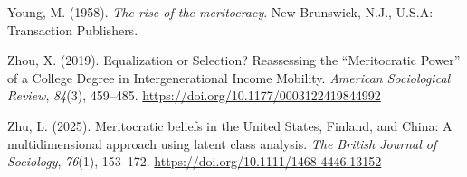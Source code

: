 \documentclass[
  13pt,
]{article}
\newlength{\cslhangindent}
\newenvironment{CSLReferences}[2] %
 {\begin{list}{}{%
  \setlength{\itemindent}{0pt}
  \setlength{\leftmargin}{0pt}
  \setlength{\parsep}{0pt}
  \ifodd #1
   \setlength{\leftmargin}{\cslhangindent}
   \setlength{\itemindent}{-1\cslhangindent}
  \fi
  \setlength{\itemsep}{#2\baselineskip}}}
 {\end{list}}
\begin{document}
\begin{CSLReferences}{1}{0}
Young, M. (1958). \emph{The rise of the meritocracy}. New Brunswick,
N.J., U.S.A: Transaction Publishers.

Zhou, X. (2019). Equalization or {Selection}? {Reassessing} the
{``{Meritocratic Power}''} of a {College Degree} in {Intergenerational
Income Mobility}. \emph{American Sociological Review}, \emph{84}(3),
459--485. \url{https://doi.org/10.1177/0003122419844992}

Zhu, L. (2025). Meritocratic beliefs in the {United States}, {Finland},
and {China}: {A} multidimensional approach using latent class analysis.
\emph{The British Journal of Sociology}, \emph{76}(1), 153--172.
\url{https://doi.org/10.1111/1468-4446.13152}

\end{CSLReferences}
\end{document}
